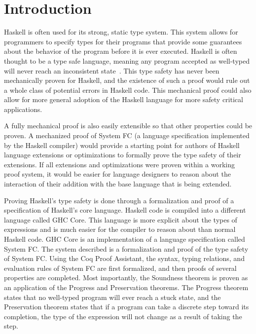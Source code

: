 \documentclass{sig-alternate}
\begin{document}

\section{Introduction}
\label{sec:intro}

Haskell is often used for its strong, static type system. This system allows for programmers to specify types for their programs that provide some guarantees about the behavior of the program before it is ever executed. Haskell is often thought to be a type safe language, meaning any program accepted as well-typed will never reach an inconsistent state~\cite{Pierce:SF}. This type safety has never been mechanically proven for Haskell, and the existence of such a proof would rule out a whole class of potential errors in Haskell code. This mechanical proof could also allow for more general adoption of the Haskell language for more safety critical applications.

A fully mechanical proof is also easily extensible so that other properties could be proven. A mechanized proof of System FC (a language specification implemented by the Haskell compiler) would provide a starting point for authors of Haskell language extensions or optimizations to formally prove the type safety of their extensions. If all extensions and optimizations were proven within a working proof system, it would be easier for language designers to reason about the interaction of their addition with the base language that is being extended.

Proving Haskell's type safety is done through a formalization and proof of a specification of Haskell's core language. Haskell code is compiled into a different language called GHC Core. This language is more explicit about the types of expressions and is much easier for the compiler to reason about than normal Haskell code. GHC Core is an implementation of a language specification called System FC. The system described is a formalization and proof of the type safety of System FC. Using the Coq Proof Assistant, the syntax, typing relations, and evaluation rules of System FC are first formalized, and then proofs of several properties are completed. Most importantly, the Soundness theorem is proven as an application of the Progress and Preservation theorems. The Progress theorem states that no well-typed program will ever reach a stuck state, and the Preservation theorem states that if a program can take a discrete step toward its completion, the type of the expression will not change as a result of taking the step.
\end{document}

